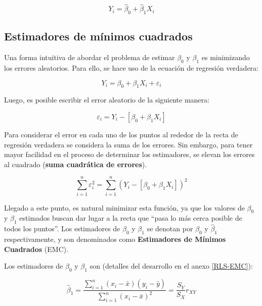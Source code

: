 \documentclass[
  11pt,
]{book}
\theoremstyle{definition}
\theoremstyle{definition}
\theoremstyle{definition}
\theoremstyle{definition}
\theoremstyle{remark}
\begin{document}
\begin{equation}
Y_i = \widehat{\beta}_0 + \widehat{\beta}_1X_i
\label{eq:ecuacion-regresion-estimada}
\end{equation}

\subsection{Estimadores de mínimos cuadrados}\label{EMCRLS}

Una forma intuitiva de abordar el problema de estimar \(\beta_0\) y \(\beta_1\) es minimizando los errores aleatorios. Para ello, se hace uso de la ecuación de regresión verdadera:

\[
Y_i = \beta_0 + \beta_1X_i + \varepsilon_i
\]

Luego, es posible escribir el error aleatorio de la siguiente manera:

\begin{equation}
\varepsilon_i = Y_i - [\beta_0 + \beta_1X_i]
\label{eq:funcion-errores}
\end{equation}

Para considerar el error en cada uno de los puntos al rededor de la recta de regresión verdadera se considera la suma de los errores. Sin embargo, para tener mayor facilidad en el proceso de determinar los estimadores, se elevan los errores al cuadrado (\textbf{suma cuadrática de errores}).

\begin{equation}
\sum_{i=1}^n\varepsilon_i^2 = \sum_{i=1}^n (Y_i - [\beta_0 + \beta_1X_i])^2
\label{eq:sumacuadratica-RL}
\end{equation}

Llegado a este punto, es natural minimizar esta función, ya que los valores de \(\beta_0\) y \(\beta_1\) estimados buscan dar lugar a la recta que ``pasa lo más cerca posible de todos los puntos''. Los estimadores de \(\beta_0\) y \(\beta_1\) se denotan por \(\widehat{\beta}_0\) y \(\widehat{\beta}_1\) respectivamente, y son denominados como \textbf{Estimadores de Mínimos Cuadrados} (EMC).

Los estimadores de \(\beta_0\) y \(\beta_1\) son (detalles del desarrollo en el anexo \ref{RLS-EMC}):

\begin{equation}
\widehat{\beta}_1 = \frac{\displaystyle\sum_{i=1}^n(x_i-\bar{x})(y_i-\bar{y})}{\displaystyle\sum_{i=1}^n(x_i-\bar{x})^2} = \frac{S_Y}{S_X}r_{XY}
\label{eq:beta1gorro}
\end{equation}
\end{document}
